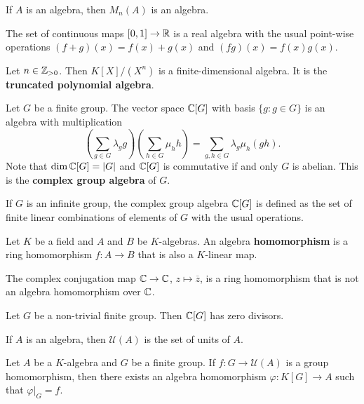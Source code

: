 \begin{example}
	If $A$ is an algebra, then  $M_n(A)$ is an algebra. 
\end{example}

\begin{example}
	The set of continuous maps $[0,1]\to\mathbb{R}$ is a real algebra with the usual
	point-wise operations $(f+g)(x)=f(x)+g(x)$ and $(fg)(x)=f(x)g(x)$. 
\end{example}

\begin{example}
	Let $n\in\mathbb{Z}_{>0}$. Then $K[X]/(X^n)$ is a finite-dimensional algebra. 
    It is the \textbf{truncated polynomial algebra}.  
\end{example}

\begin{example}
	Let $G$ be a finite group. The vector space 
	$\mathbb{C}[G]$ with basis $\{g:g\in G\}$
	is an algebra with multiplication
	\[
	\left(\sum_{g\in G}\lambda_gg\right)\left(\sum_{h\in G}\mu_hh\right)
	=\sum_{g,h\in G}\lambda_g\mu_h(gh).
	\] 	
	Note that $\dim\mathbb{C}[G]=|G|$ and
	$\mathbb{C}[G]$ is commutative if and only $G$ is abelian. 
	This is the \textbf{complex group algebra} of $G$. 
\end{example}

If $G$ is an infinite group, the complex group algebra $\mathbb{C}[G]$ 
is defined as the set 
of finite linear combinations of elements of $G$ 
with the usual operations. 

\begin{definition}
    Let $K$ be a field and $A$ and $B$ be $K$-algebras. 
    An algebra \textbf{homomorphism} is a ring homomorphism $f\colon A\to B$ that is also a $K$-linear map. 
\end{definition}

The complex conjugation map  
$\mathbb{C}\to \mathbb{C}$, $z\mapsto\overline{z}$, is a ring homomorphism that is not an algebra homomorphism over $\mathbb{C}$. 
 
\begin{exercise}
	Let $G$ be a non-trivial finite group. 
	Then $\mathbb{C}[G]$ has zero divisors. 
\end{exercise}

If $A$ is an algebra, then $\mathcal{U}(A)$ is the set 
of units of $A$. 

\begin{exercise}
	Let $A$ be a $K$-algebra and $G$ be a finite group. 
	If $f\colon G\to\mathcal{U}(A)$ is a group homomorphism, 
	then there exists an algebra homomorphism 
	$\varphi\colon K[G]\to A$ such that $\varphi|_G=f$.   	
\end{exercise}

